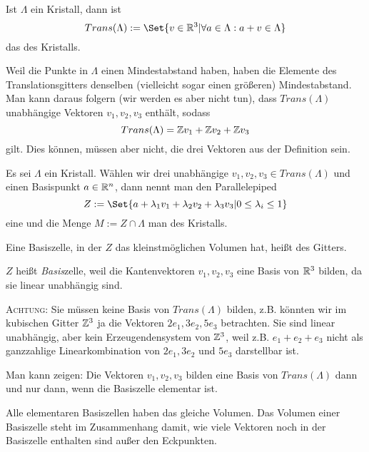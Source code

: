 \begin{definition}
Ist $\Lambda$ ein Kristall, dann ist
\[Trans(\Lambda) := \Set{v\in\IR^3 | \forall a\in\Lambda: a+v\in\Lambda}\]
das  des Kristalls.
\end{definition}

\begin{remark}
Weil die Punkte in $\Lambda$ einen Mindestabstand haben, haben die Elemente des Translationsgitters denselben (vielleicht sogar einen größeren) Mindestabstand. Man kann daraus folgern (wir werden es aber nicht tun), dass $Trans(\Lambda)$ unabhängige Vektoren $v_1,v_2,v_3$ enthält, sodass
\[Trans(\Lambda) = \mathbb{Z} v_1+\mathbb{Z} v_2+\mathbb{Z} v_3\]
gilt. Dies können, müssen aber nicht, die drei Vektoren aus der Definition sein.
\end{remark}

\begin{definition}
Es sei $\Lambda$ ein Kristall. Wählen wir drei unabhängige $v_1,v_2,v_3\in Trans(\Lambda)$ und einen Basispunkt $a\in\mathbb{R}^n$, dann nennt man den Parallelepiped
\[Z:=\Set{a+\lambda_1 v_1 + \lambda_2 v_2 + \lambda_3 v_3 | 0\leq \lambda_i \leq 1}\]
eine  und die Menge $M:=Z\cap\Lambda$ man  des Kristalls.

Eine Basiszelle, in der $Z$ das kleinstmöglichen Volumen hat, heißt  des Gitters.
\end{definition}

\begin{remark}
$Z$ heißt \emph{Basis}zelle, weil die Kantenvektoren $v_1,v_2,v_3$ eine Basis von $\mathbb{R}^3$ bilden, da sie linear unabhängig sind.

\textsc{Achtung}: Sie müssen keine Basis von $Trans(\Lambda)$ bilden, z.B. könnten wir im kubischen Gitter $\mathbb{Z}^3$ ja die Vektoren $2e_1,3e_2,5e_3$ betrachten. Sie sind linear unabhängig, aber kein Erzeugendensystem von $\mathbb{Z}^3$, weil z.B. $e_1+e_2+e_3$ nicht als ganzzahlige Linearkombination von $2e_1, 3e_2$ und $5e_3$ darstellbar ist.
\end{remark}

\begin{remark}
Man kann zeigen: Die Vektoren $v_1,v_2,v_3$ bilden eine Basis von $Trans(\Lambda)$ dann und nur dann, wenn die Basiszelle elementar ist.

Alle elementaren Basiszellen haben das gleiche Volumen. Das Volumen einer Basiszelle steht im Zusammenhang damit, wie viele Vektoren noch in der Basiszelle enthalten sind außer den Eckpunkten.
\end{remark}

